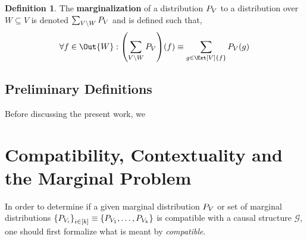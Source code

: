 \documentclass[aps, 10pt, english, twoside, pra, nofootinbib, longbibliography]{revtex4-1}
\theoremstyle{plain}
\theoremstyle{definition}
\newtheorem{definition}[theorem]{Definition}
\theoremstyle{remark}
\newcommand{\graph}{\mathcal{G}}
\newcommand{\term}[1]{\textcolor{Mahogany}{\textbf{#1}}}
\begin{document}
    \begin{definition}
        The \term{marginalization} of a distribution $\prob[V]$ to a distribution over $W \subseteq V$ is denoted $\sum_{V \setminus W} \prob[V]$ and is defined such that,
        \[ \forall f \in \Out{W} : \br{\sum_{V \setminus W} \prob[V]}\br{f} \defined \sum_{g \in \Ext[V]{f}} \prob[V][g] \]
    \end{definition}

    \subsection{Preliminary Definitions}

    Before discussing the present work, we


    \section{Compatibility, Contextuality and the Marginal Problem}
    \label{sec:comp_con_mp}
    In order to determine if a given marginal distribution $\prob[V]$ or set of marginal distributions $\bc{\prob[V_i]}_{i \in \bs{k}} \defined \bc{\prob[V_1], \ldots, \prob[V_k]}$ is compatible with a causal structure $\graph$, one should first formalize what is meant by \textit{compatible}.
\end{document}
